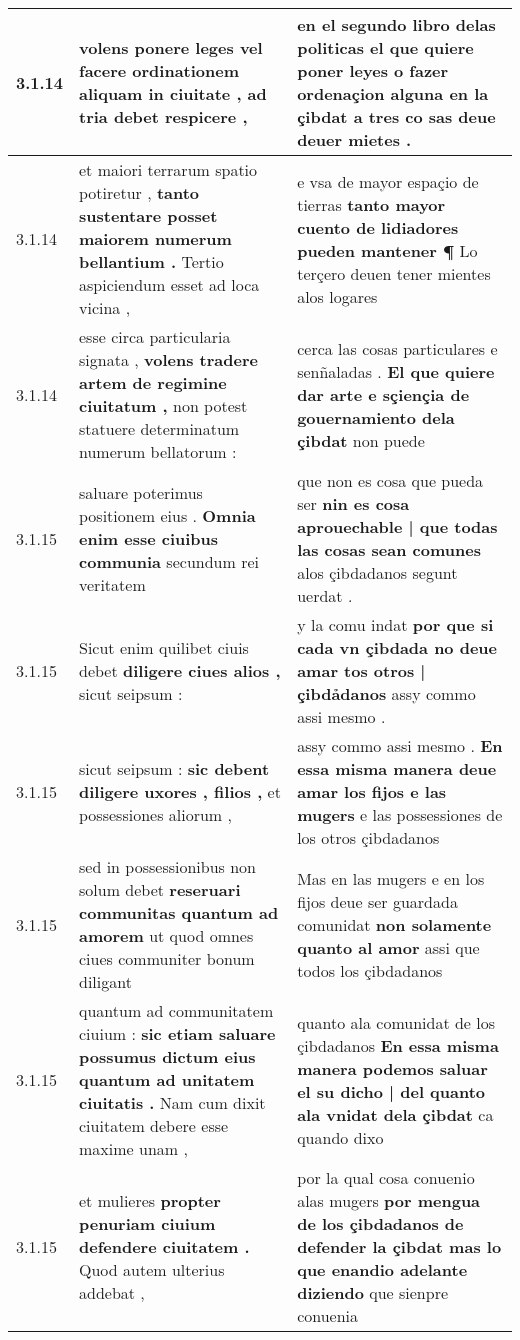 \begin{tabular}{|p{1cm}|p{6.5cm}|p{6.5cm}|}
3.1.14 & volens ponere leges \textbf{ vel facere ordinationem aliquam in ciuitate , } ad tria debet respicere , & en el segundo libro delas politicas \textbf{ el que quiere poner leyes o fazer ordenaçion alguna en la çibdat a tres } co sas deue deuer mietes . \\\hline
3.1.14 & et maiori terrarum spatio potiretur , \textbf{ tanto sustentare posset maiorem numerum bellantium . } Tertio aspiciendum esset ad loca vicina , & e vsa de mayor espaçio de tierras \textbf{ tanto mayor cuento de lidiadores pueden mantener ¶ } Lo terçero deuen tener mientes alos logares \\\hline
3.1.14 & esse circa particularia signata , \textbf{ volens tradere artem de regimine ciuitatum , } non potest statuere determinatum numerum bellatorum : & cerca las cosas particulares e senñaladas . \textbf{ El que quiere dar arte e sçiençia de gouernamiento dela çibdat } non puede \\\hline
3.1.15 & saluare poterimus positionem eius . \textbf{ Omnia enim esse ciuibus communia } secundum rei veritatem & que non es cosa que pueda ser \textbf{ nin es cosa aprouechable | que todas las cosas sean comunes } alos çibdadanos segunt uerdat . \\\hline
3.1.15 & Sicut enim quilibet ciuis debet \textbf{ diligere ciues alios , } sicut seipsum : & y la comu indat \textbf{ por que si cada vn çibdada no deue amar tos otros | çibdảdanos } assy commo assi mesmo . \\\hline
3.1.15 & sicut seipsum : \textbf{ sic debent diligere uxores , filios , } et possessiones aliorum , & assy commo assi mesmo . \textbf{ En essa misma manera deue amar los fijos e las mugers } e las possessiones de los otros çibdadanos \\\hline
3.1.15 & sed in possessionibus non solum debet \textbf{ reseruari communitas quantum ad amorem } ut quod omnes ciues communiter bonum diligant & Mas en las mugers e en los fijos deue ser guardada comunidat \textbf{ non solamente quanto al amor } assi que todos los çibdadanos \\\hline
3.1.15 & quantum ad communitatem ciuium : \textbf{ sic etiam saluare possumus dictum eius quantum ad unitatem ciuitatis . } Nam cum dixit ciuitatem debere esse maxime unam , & quanto ala comunidat de los çibdadanos \textbf{ En essa misma manera podemos saluar el su dicho | del quanto ala vnidat dela çibdat } ca quando dixo \\\hline
3.1.15 & et mulieres \textbf{ propter penuriam ciuium defendere ciuitatem . } Quod autem ulterius addebat , & por la qual cosa conuenio alas mugers \textbf{ por mengua de los çibdadanos de defender la çibdat mas lo que enandio adelante diziendo } que sienpre conuenia \\\hline

\end{tabular}
